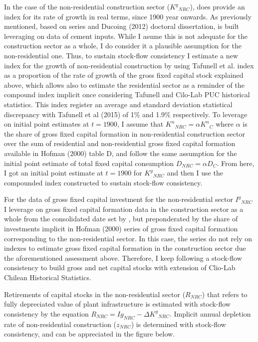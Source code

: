 In the case of the non-residential construction sector (${K^{g}}_{NRC}$), \citet{Tafunell2016}  does provide an index for its rate of growth in real terms, since 1900 year onwards. As previously mentioned,\citet{Tafunell2016} based on \citet{Tafunell2013} series and Ducoing (2012) doctoral dissertation, is built leveraging on data of cement inputs. While I asume this is not adequate for the construction sector as a whole, I do consider it a plausible assumption for the non-residential one. Thus, to sustain stock-flow consistency I estimate a new index for the growth of non-residential construction by using Tafunell et al. index as a proportion of the rate of growth of the gross fixed capital stock explained above, which allows also to estimate the residential sector as a reminder of the compound index implicit once considering Tafunell and Cilo-Lab PUC historical statistics. This index register an average and standard deviation statistical discrepancy with Tafunell et al (2015) of 1\% and 1.9\% respectively. To leverage on initial point estimates at $t=1900$, I assume that ${K^{n}}_{NRC}= \alpha {K^{n}}_{C}$  where $\alpha$  is the share of gross fixed capital formation in non-residential construction sector over the sum of residential and non-residential gross fixed capital formation available in Hofman (2000) table D, and follow the same assumption for the initial point estimate of total fixed capital consumption $D_{NRC} = \alpha D_{C}$.  From here, I got an initial point estimate at $t=1900$ for ${K^{g}}_{NRC}$ and then I use the compounded index constructed to sustain stock-flow consistency.  

For the data of gross fixed capital investment for the non-residential sector ${I^{g}}_{NRC}$ I leverage on gross fixed capital formation data in the construction sector as a whole from the consolidated date set by \citet{PerezEyzaguirre2019}, but preponderated by the share of investments implicit in Hofman (2000) series of gross fixed capital formation corresponding to the non-residential sector. In this case, the series do not rely on \citet{Tafunell2016} indexes to estimate gross fixed capital formation in the construction sector due the aforementioned assessment above. Therefore, I keep following a stock-flow consistency to build gross and net capital stocks with \citet{PerezEyzaguirre2019} extension of Clio-Lab Chilean Historical Statistics. 
	   
Retirements of capital stocks in the non-residential sector ($R_{NRC}$) that refers to fully depreciated value of plant infrastructure is estimated with stock-flow consistency by the equation $R_{NRC} = Ig_{NRC} - \Delta {K^{g}}_{NRC}$. Implicit annual depletion rate of non-residential construction ($z_{NRC}$) is determined with stock-flow consistency, and can be appreciated in the figure below. 


